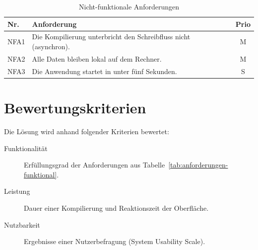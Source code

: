 \begin{table}[htbp]
  \centering
  \caption{Nicht-funktionale Anforderungen}
  \label{tab:anforderungen-nichtfunktional}
  \begin{tabularx}{\textwidth}{lXc}
    \toprule
    Nr. & Anforderung & Prio \\
    \midrule
    NFA1 & Die Kompilierung unterbricht den Schreibfluss nicht (asynchron). & M \\
    NFA2 & Alle Daten bleiben lokal auf dem Rechner. & M \\
    NFA3 & Die Anwendung startet in unter fünf Sekunden. & S \\
    \bottomrule
  \end{tabularx}
\end{table}

\section{Bewertungskriterien}
\label{sec:kriterien}

Die Lösung wird anhand folgender Kriterien bewertet:
\begin{description}
  \item[Funktionalität] Erfüllungsgrad der Anforderungen aus Tabelle~\ref{tab:anforderungen-funktional}.
  \item[Leistung] Dauer einer Kompilierung und Reaktionszeit der Oberfläche.
  \item[Nutzbarkeit] Ergebnisse einer Nutzerbefragung (\zB System Usability Scale).
\end{description}
